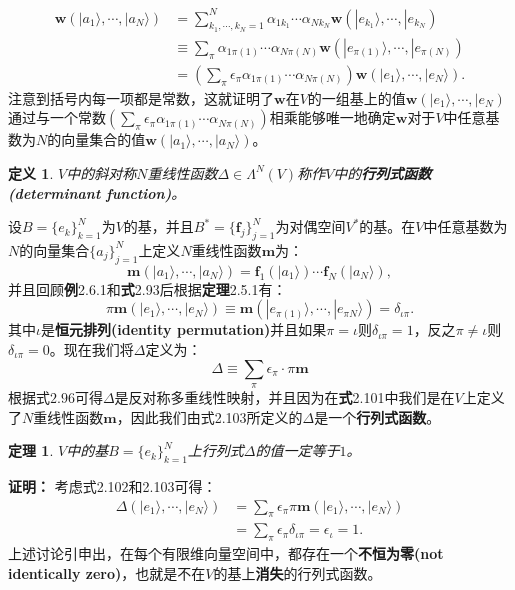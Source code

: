 \documentclass[mathserif,hyperref,UTF8,openany,b5paper]{ctexbook}
\newtheorem{defn}{定义}[section]
\newtheorem{thm}{定理}[section]
\begin{document}
\begin{align}
    \mathbf{w}(|a_1\rangle,\cdots,|a_N\rangle)&=\sum^N_{k_1,\cdots,k_N=1}\alpha_{1k_1}\cdots\alpha_{Nk_N}\mathbf{w}(|e_{k_1}\rangle,\cdots,|e_{k_N})\\
    &\equiv\sum_\pi \alpha_{1\pi(1)}\cdots\alpha_{N\pi(N)}\mathbf{w}(|e_{\pi(1)}\rangle,\cdots,|e_{\pi(N)})\\
    &=\left( \sum_\pi \epsilon_\pi\alpha_{1\pi(1)}\cdots\alpha_{N\pi(N)}\right)\mathbf{w}(|e_1\rangle,\cdots,|e_N\rangle).
\end{align}注意到括号内每一项都是常数，这就证明了$\mathbf{w}$在$V$的一组基上的值$\mathbf{w}(|e_1\rangle,\cdots,|e_N)$通过与一个常数$\left( \sum_\pi \epsilon_\pi\alpha_{1\pi(1)}\cdots\alpha_{N\pi(N)}\right)$相乘能够唯一地确定$\mathbf{w}$对于$V$中任意基数为$N$的向量集合的值$\mathbf{w}(|a_1\rangle,\cdots,|a_N\rangle)$。
\begin{defn}
$V$中的斜对称$N$重线性函数$\Delta\in\Lambda^N(V)$称作$V$中的\textbf{行列式函数(determinant function)}。
\end{defn}
设$B=\{e_k\}^N_{k=1}$为$V$的基，并且$B^*=\{\mathbf{f}_j\}^N_{j=1}$为对偶空间$V^*$的基。在$V$中任意基数为$N$的向量集合$\{a_j\}^N_{j=1}$上定义$N$重线性函数$\mathbf{m}$为：
\begin{equation}
    \mathbf{m}(|a_1\rangle,\cdots,|a_N\rangle)=\mathbf{f}_1(|a_1\rangle)\cdots\mathbf{f}_N(|a_N\rangle),
\end{equation}
并且回顾\textbf{例}2.6.1和\textbf{式}2.93后根据\textbf{定理}2.5.1有：
\begin{equation}
    \pi\mathbf{m}(|e_1\rangle,\cdots,|e_N\rangle)\equiv\mathbf{m}(|e_{\pi(1)}\rangle,\cdots,|e_{\pi{N}}\rangle)=\delta_{\iota\pi}.
\end{equation}
其中$\iota$是\textbf{恒元排列(identity permutation)}并且如果$\pi=\iota$则$\delta_{\iota\pi}=1$，反之$\pi\neq\iota$则$\delta_{\iota\pi}=0$。现在我们将$\Delta$定义为：
\begin{equation}
    \Delta\equiv\sum_\pi\epsilon_\pi\cdot\pi\mathbf{m}
\end{equation}根据式$2.96$可得$\Delta$是反对称多重线性映射，并且因为在\textbf{式}2.101中我们是在$V$上定义了$N$重线性函数$\mathbf{m}$，因此我们由式2.103所定义的$\Delta$是一个\textbf{行列式函数}。
\begin{thm}
$V$中的基$B=\{e_k\}^N_{k=1}$上行列式$\Delta$的值一定等于$1$。
\end{thm}
\textbf{证明：} 考虑式2.102和2.103可得：
\begin{align}
\Delta(|e_1\rangle,\cdots,|e_N\rangle)&=\sum_\pi\epsilon_\pi\pi\mathbf{m}(|e_1\rangle,\cdots,|e_N\rangle)\\
&=\sum_\pi\epsilon_\pi\delta_{\iota\pi}=\epsilon_\iota=1.
\end{align}
上述讨论引申出，在每个有限维向量空间中，都存在一个\textbf{不恒为零(not identically zero)}，也就是不在$V$的基上\textbf{消失}的行列式函数。
\end{document}
